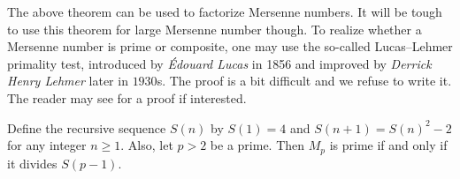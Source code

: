 \documentclass{subfiles}
\begin{document}
	The above theorem can be used to factorize Mersenne numbers. It will be tough to use this theorem for large Mersenne number though. To realize whether a Mersenne number is prime or composite, one may use the so-called Lucas–Lehmer primality test, introduced by \textit{\'Edouard Lucas} in 1856 and improved by \textit{Derrick Henry Lehmer} later in $1930$s. The proof is a bit difficult and we refuse to write it. The reader may see \cite{ch:primes-bruce} for a proof if interested.
	
		\begin{theorem}
			Define the recursive sequence $S(n)$ by $S(1)=4$ and $S(n+1)=S(n)^2-2$ for any integer $n \geq 1$. Also, let $p>2$ be a prime. Then $M_p$ is prime if and only if it divides $S(p-1)$.
		\end{theorem}
\end{document}
